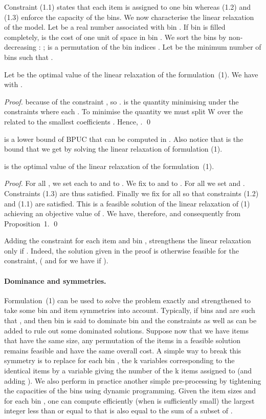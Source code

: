 Constraint (1.1) states that each item is assigned to  one bin whereas (1.2) and (1.3) enforce the capacity of the bins. We now  characterise the linear relaxation of the model. 
Let  be a real number associated with bin . If bin  is filled completely,  is the cost of one unit of space in bin . We sort the bins by non-decreasing : ;  is a permutation of the bin indices . Let   be the minimum number of bins such that .
\begin{proposition}
Let  be the optimal value of the linear relaxation of the formulation~(1). We have  with 
. 
\end{proposition}
 \begin{proof}
  because of the constraint , so .  is the quantity minimising  under the constraints  where each . To minimise the quantity  we must split W over the  related to the smallest coefficients . Hence, . \qed
 \end{proof} 
 is a lower bound of BPUC  that can be computed in . Also notice that   is  the bound that we get by solving the linear relaxation of formulation (1).
\begin{proposition}
  is the optimal value of the linear relaxation of the formulation~(1). 
\end{proposition}
\begin{proof} For all , we set each  to  and  to .  We fix  to  and  to . For all  we set  and . Constraints (1.3) are thus satisfied. Finally we fix  for all  so that constraints (1.2) and (1.1) are satisfied. This is a feasible solution of the linear relaxation of (1) achieving an objective value of . We have, therefore,  and consequently  from Proposition~1.  \qed
 \end{proof}
Adding the constraint  for each item  and bin , strengthens the linear relaxation only if . Indeed, the solution given in the proof is otherwise feasible for the constraint, ( and for  we have  if ). 




\paragraph{Dominance and symmetries.} Formulation~(1) can be used to solve the problem exactly and strengthened to take some bin and item symmetries into account. Typically, if bins  and  are such that ,  and  then bin  is said to dominate bin  and the constraints  as well as  can be added to rule out some dominated solutions. 
Suppose now that we have  items that have the same size, any permutation of the items in a feasible solution remains feasible and have the same overall cost. A simple way to break this symmetry is to replace for each bin , the k variables   corresponding to the identical items by a variable  giving the number of the k items assigned to  (and adding ). We also perform in practice another simple pre-processing by tightening the capacities of the bins using dynamic programming. Given the item sizes and for each bin , one can compute efficiently (when  is sufficiently small) the largest integer less than or equal to  that is also equal to the sum of a subset of . 






